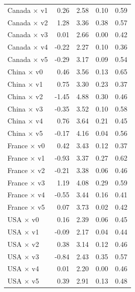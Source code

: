 \begin{table}[htbp]
\begin{small}
\begin{sc}
\begin{tabular}{lrrll}
  Canada $\times$ v1 &  0.26 & 2.58 & 0.10 & 0.59 \\
  Canada $\times$ v2 &  1.28 & 3.36 & 0.38 & 0.57 \\
  Canada $\times$ v3 &  0.01 & 2.66 & 0.00 & 0.42 \\
  Canada $\times$ v4 & -0.22 & 2.27 & 0.10 & 0.36 \\
  Canada $\times$ v5 & -0.29 & 3.17 & 0.09 & 0.54 \\
  \midrule
  China $\times$ v0  &  0.46 & 3.56 & 0.13 & 0.65 \\
  China $\times$ v1  &  0.75 & 3.30 & 0.23 & 0.37 \\
  China $\times$ v2  & -1.45 & 4.88 & 0.30 & 0.46 \\
  China $\times$ v3  & -0.35 & 3.52 & 0.10 & 0.58 \\
  China $\times$ v4  &  0.76 & 3.64 & 0.21 & 0.45 \\
  China $\times$ v5  & -0.17 & 4.16 & 0.04 & 0.56 \\
  \midrule
  France $\times$ v0 &  0.42 & 3.43 & 0.12 & 0.37 \\
  France $\times$ v1 & -0.93 & 3.37 & 0.27 & 0.62 \\
  France $\times$ v2 & -0.21 & 3.38 & 0.06 & 0.46 \\
  France $\times$ v3 &  1.19 & 4.08 & 0.29 & 0.59 \\
  France $\times$ v4 & -0.55 & 3.44 & 0.16 & 0.41 \\
  France $\times$ v5 &  0.07 & 3.73 & 0.02 & 0.42 \\
  \midrule
  USA $\times$ v0    &  0.16 & 2.39 & 0.06 & 0.45 \\
  USA $\times$ v1    & -0.09 & 2.17 & 0.04 & 0.44 \\
  USA $\times$ v2    &  0.38 & 3.14 & 0.12 & 0.46 \\
  USA $\times$ v3    & -0.84 & 2.43 & 0.35 & 0.57 \\
  USA $\times$ v4    &  0.01 & 2.20 & 0.00 & 0.46 \\
  USA $\times$ v5    &  0.39 & 2.91 & 0.13 & 0.48 \\
  \bottomrule
  \end{tabular}
  \end{sc}
  \end{small}
\end{table}

